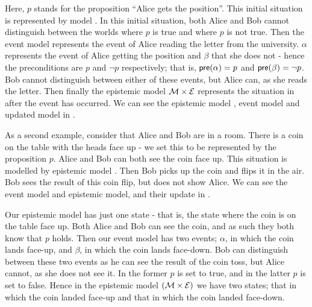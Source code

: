 \documentclass[ %
                    author={Leo Poulson},
                supervisor={Dr. Steven Ramsay},
                    degree={BSc},
                     title={Epistemic Planning for the Dynamic Gossip problem},
                  subtitle={},
                      year={2019} ]{dissertation}
\begin{document}
Here, $p$ stands for the proposition ``Alice gets the position''. This initial
situation is represented by model . In this initial situation, both Alice
and Bob cannot distinguish between the worlds where $p$ is true and where $p$ is
not true. Then the event model  represents the event of Alice reading the letter
from the university. $\alpha$ represents the event of Alice getting the position
and $\beta$ that she does not - hence the preconditions are $p$ and $\neg
p$ respectively; that is, $\textsf{pre}(\alpha) = p$ and $\textsf{pre}(\beta) = \neg p$. Bob
cannot distinguish between either of these events, but Alice can, as she reads
the letter. Then finally the epistemic model $\mathcal{M} \times \mathcal{E}$ represents the situation
in  after the event  has occurred. We can see the epistemic model ,
event model  and updated model  in .

As a second example, consider that Alice and Bob are in a room. There is a coin
on the table with the heads face up - we set this to be represented by the
proposition $p$. Alice and Bob can both see the coin face up. This situation is
modelled by epistemic model . Then Bob picks up the coin and flips it in
the air. Bob sees the result of this coin flip, but does not show Alice. We can
see the event model and epistemic model, and their update in
.

Our epistemic model has just one state - that is, the state where the coin is on
the table face up. Both Alice and Bob can see the coin, and as such they both
know that $p$ holds. Then our event model has two events; $\alpha$, in which the
coin lands face-up, and $\beta$, in which the coin lands face-down. Bob can
distinguish between these two events as he can see the result of the coin toss,
but Alice cannot, as she does not see it. In the former $p$ is set to true,
and in the latter $p$ is set to false. Hence in the epistemic model $(\mathcal{M}
\times \mathcal{E})$ we have two states; that in which the coin landed face-up and
that in which the coin landed face-down.
\end{document}
